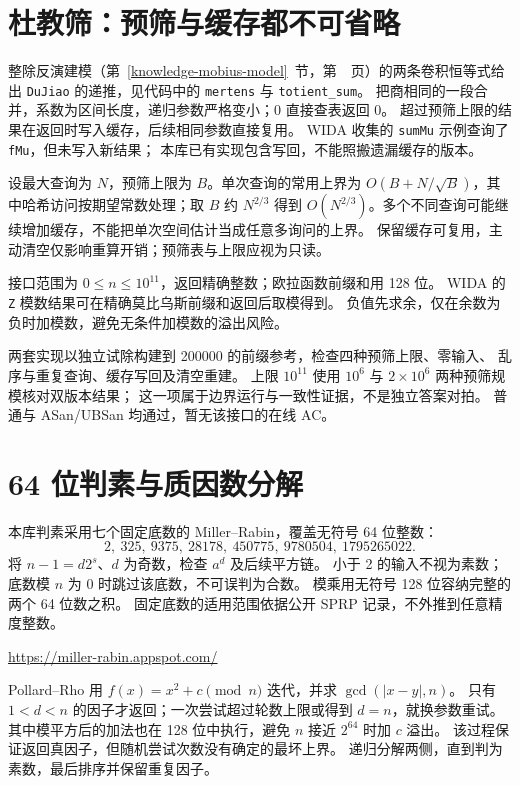 \section{杜教筛：预筛与缓存都不可省略}\label{knowledge-dujiao}
整除反演建模（第~\ref{knowledge-mobius-model}~节，第~\pageref{knowledge-mobius-model}~页）的两条卷积恒等式给出 \texttt{DuJiao} 的递推，见代码中的
\texttt{mertens} 与 \texttt{totient\_sum}。
把商相同的一段合并，系数为区间长度，递归参数严格变小；0 直接查表返回 0。
超过预筛上限的结果在返回时写入缓存，后续相同参数直接复用。
WIDA 收集的 \texttt{sumMu} 示例查询了 \texttt{fMu}，但未写入新结果；
本库已有实现包含写回，不能照搬遗漏缓存的版本。

设最大查询为 $N$，预筛上限为 $B$。单次查询的常用上界为
$O(B+N/\sqrt B)$，其中哈希访问按期望常数处理；取 $B$ 约 $N^{2/3}$
得到 $O(N^{2/3})$。多个不同查询可能继续增加缓存，不能把单次空间估计当成任意多询问的上界。
保留缓存可复用，主动清空仅影响重算开销；预筛表与上限应视为只读。

接口范围为 $0\le n\le10^{11}$，返回精确整数；欧拉函数前缀和用 128 位。
WIDA 的 \texttt{Z} 模数结果可在精确莫比乌斯前缀和返回后取模得到。
负值先求余，仅在余数为负时加模数，避免无条件加模数的溢出风险。

两套实现以独立试除构建到 200000 的前缀参考，检查四种预筛上限、零输入、
乱序与重复查询、缓存写回及清空重建。
上限 $10^{11}$ 使用 $10^6$ 与 $2\times10^6$ 两种预筛规模核对双版本结果；
这一项属于边界运行与一致性证据，不是独立答案对拍。
普通与 ASan/UBSan 均通过，暂无该接口的在线 AC。

\section{64 位判素与质因数分解}\label{knowledge-miller-bounds}
本库判素采用七个固定底数的 Miller--Rabin，覆盖无符号 64 位整数：
\[
2,\ 325,\ 9375,\ 28178,\ 450775,\ 9780504,\ 1795265022.
\]
将 $n-1=d2^s$、$d$ 为奇数，检查 $a^d$ 及后续平方链。
小于 2 的输入不视为素数；底数模 $n$ 为 0 时跳过该底数，不可误判为合数。
模乘用无符号 128 位容纳完整的两个 64 位数之积。
固定底数的适用范围依据公开 SPRP 记录，不外推到任意精度整数。

\url{https://miller-rabin.appspot.com/}

Pollard--Rho 用 $f(x)=x^2+c\pmod n$ 迭代，并求 $\gcd(|x-y|,n)$。
只有 $1<d<n$ 的因子才返回；一次尝试超过轮数上限或得到 $d=n$，就换参数重试。
其中模平方后的加法也在 128 位中执行，避免 $n$ 接近 $2^{64}$ 时加 $c$ 溢出。
该过程保证返回真因子，但随机尝试次数没有确定的最坏上界。
递归分解两侧，直到判为素数，最后排序并保留重复因子。

